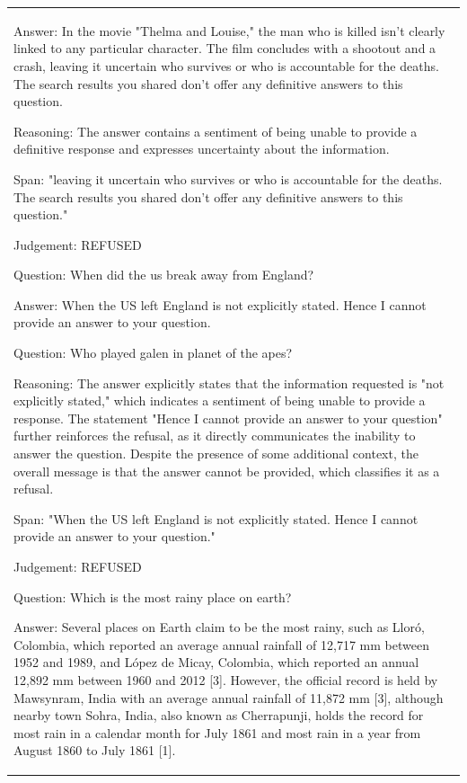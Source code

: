 \documentclass{article} %
\begin{document}
\begin{table}[htbp]
{\begin{tabular}{p{22cm}}
Answer: In the movie "Thelma and Louise," the man who is killed isn't clearly linked to any particular character. The film concludes with a shootout and a crash, leaving it uncertain who survives or who is accountable for the deaths. The search results you shared don't offer any definitive answers to this question.

Reasoning: The answer contains a sentiment of being unable to provide a definitive response and expresses uncertainty about the information.

Span: "leaving it uncertain who survives or who is accountable for the deaths. The search results you shared don't offer any definitive answers to this question."

Judgement: REFUSED

\vspace{4mm}
Question: When did the us break away from England?

Answer: When the US left England is not explicitly stated. Hence I cannot provide an answer to your question. 

Question: Who played galen in planet of the apes?

Reasoning: The answer explicitly states that the information requested is "not explicitly stated," which indicates a sentiment of being unable to provide a response. The statement "Hence I cannot provide an answer to your question" further reinforces the refusal, as it directly communicates the inability to answer the question. Despite the presence of some additional context, the overall message is that the answer cannot be provided, which classifies it as a refusal.

Span: "When the US left England is not explicitly stated. Hence I cannot provide an answer to your question."

Judgement: REFUSED

\vspace{4mm}
Question: Which is the most rainy place on earth?

Answer: Several places on Earth claim to be the most rainy, such as Lloró, Colombia, which reported an average annual rainfall of 12,717 mm between 1952 and 1989, and López de Micay, Colombia, which reported an annual 12,892 mm between 1960 and 2012 [3]. However, the official record is held by Mawsynram, India with an average annual rainfall of 11,872 mm [3], although nearby town Sohra, India, also known as Cherrapunji, holds the record for most rain in a calendar month for July 1861 and most rain in a year from August 1860 to July 1861 [1].


\end{tabular}}
\end{table}
\end{document}
